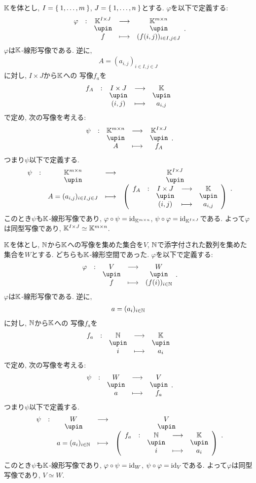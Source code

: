 \begin{example}
  $\mathbb{K}$を体とし, $I=\Set{1,\dots,m}$, $J=\Set{1,\ldots,n}$とする.
  $\varphi$を以下で定義する:
  \begin{align*}
    \shazo{\varphi}{\KK^{I\times J}}{\KK^{m\times n}}{f}{(f(i,j))_{i\in I,j\in J}}.
  \end{align*}
  $\varphi$は$\mathbb{K}$-線形写像である.
  逆に,
  \begin{align*}
    A=
      (a_{i,j})_{i\in I,j\in J}
  \end{align*}
  に対し,
  $I\times J$から$\mathbb{K}$への
  写像$f_a$を
  \begin{align*}
    \shazo{f_A}{I\times J}{\KK}{(i,j)}{a_{i,j}}
  \end{align*}
  で定め,
  次の写像を考える:
  \begin{align*}
    \shazo{\psi}{\KK^{m\times n}}{\KK^{I\times J}}{A}{f_A}.
  \end{align*}
  つまり$\psi$以下で定義する.
  \begin{align*}
    \shazo{\psi}{\KK^{m\times n}}{\KK^{I\times J}}
          {A=(a_{i,j})_{i\in I,j\in J}}{\left(\shazo{f_A}{I\times J}{\KK}{(i,j)}{a_{i,j}}\right)}.
  \end{align*}
  このとき$\psi$も$\mathbb{K}$-線形写像であり,
  $\varphi\circ\psi=\operatorname{id}_{\mathbb{K}^{m\times n}}$,
  $\psi\circ\varphi=\operatorname{id}_{\mathbb{K}^{I\times J}}$である.
  よって$\varphi$は同型写像であり,
  $\mathbb{K}^{I\times J}\simeq \mathbb{K}^{m\times n}$.
\end{example}

\begin{example}
  $\mathbb{K}$を体とし,
  $\mathbb{N}$から$\mathbb{K}$への写像を集めた集合を$V$,
  $\mathbb{N}$で添字付された数列を集めた集合を$W$とする.
  どちらも$\mathbb{K}$-線形空間であった.
  $\varphi$を以下で定義する:
  \begin{align*}
    \shazo{\varphi}{V}{W}{f}{(f(i))_{i\in \NN}}.
  \end{align*}
  $\varphi$は$\mathbb{K}$-線形写像である.
  逆に,
  \begin{align*}
    a=
      (a_{i})_{i\in \mathbb{N}}
  \end{align*}
  に対し,
  $\mathbb{N}$から$\mathbb{K}$への
  写像$f_a$を
  \begin{align*}
    \shazo{f_a}{\NN}{\KK}{i}{a_{i}}
  \end{align*}
  で定め,
  次の写像を考える:
  \begin{align*}
    \shazo{\psi}{W}{V}{a}{f_a}.
  \end{align*}
  つまり$\psi$以下で定義する.
  \begin{align*}
    \shazo{\psi}{W}{V}{a=(a_{i})_{i\in \NN}}{\left(\shazo{f_a}{\NN}{\KK}{i}{a_{i}}\right)}.
  \end{align*}
  このとき$\psi$も$\mathbb{K}$-線形写像であり,
  $\varphi\circ\psi=\operatorname{id}_{W}$,
  $\psi\circ\varphi=\operatorname{id}_{V}$である.
  よって$\varphi$は同型写像であり,
  $V\simeq W$.
\end{example}


